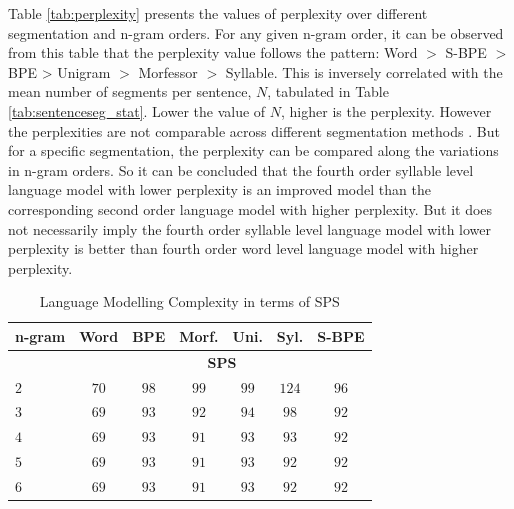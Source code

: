 Table \ref{tab:perplexity} presents the values of perplexity over different
segmentation and n-gram orders. For any given n-gram order, it can be observed
from this table that the perplexity value follows the pattern: Word $>$ S-BPE
$>$ BPE > Unigram $>$ Morfessor $>$ Syllable. This is inversely correlated with
the mean number of segments per sentence, $N$, tabulated in Table
\ref{tab:sentenceseg_stat}. Lower the value of $N$, higher is the perplexity.
However the perplexities are not comparable across different segmentation
methods \cite{Mie2016Can}. But for a specific segmentation, the perplexity can
be compared along the variations in n-gram orders. So it can be concluded that
the fourth order syllable level language model with lower perplexity is an
improved model than the corresponding second order language model with higher
perplexity. But it does not necessarily imply the fourth order syllable level
language model with lower perplexity is better than fourth order word level
language model with higher perplexity.

\begin{table}[ht]
    \centering
    \caption{Language Modelling Complexity in terms of SPS}
    \label{tab:sps}
    \begin{tabular}{l|cccccc}
        \hline \hline
        \textbf{n-gram} & \textbf{Word}                     & \textbf{BPE} & \textbf{Morf.} & \textbf{Uni.} & \textbf{Syl.} & \textbf{S-BPE} \\ \hline

        \textbf{}      & \multicolumn{6}{c}{\textbf{SPS}}                                                                                  \\ \hline
       $2$            & $70$                                & $98$           & $99$             & $99$            & $124$           & $96$             \\
        $3$            & $69$                                & $93$           & $92$             & $94$            & $98$            & $92$             \\
        $4$            & $69$                                & $93$           & $91$             & $93$            & $93$            & $92$             \\
       $5$            & $69$                                & $93$           & $91$             & $93$            & $92$            & $92$             \\
        $6$            & $69$                                & $93$           & $91$             & $93$            & $92$            & $92$             \\
        \hline

    \end{tabular}

\end{table}

